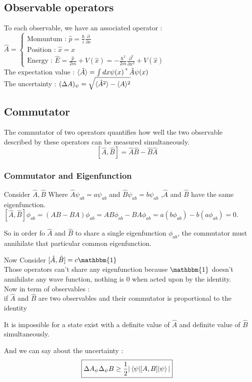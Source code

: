 \documentclass[12pt,oneside]{book}
\begin{document}
\subsection{Observable operators}
To each observable, we have an associated operator :\\
$\hat{A} = \begin{cases}
		\text{Momuntum : } \hat{p} = \frac{\hbar}{i}\frac{\partial}{\partial x} \\
		\text{Position : } \hat{x} = x                                          \\
		\text{Energy : } \hat{E} = \frac{\hat{p}}{2m}+ V(\hat{x}) = -\frac{\hbar^2}{2m}\frac{\partial^2}{\partial x^2} + V(\hat{x})
	\end{cases}$\\
The expectation value : $\langle \hat{A} \rangle = \int dx \psi(x)\operatorname{^*}\hat{A}\psi(x)$\\
The uncertainty : $(\Delta A)_\psi = \sqrt{\langle \hat{A}^2 \rangle-\langle A \rangle^2}$
\subsection{Commutator}
The commutator of two operators quantifies how well the two observable described by these operators can be measured simultaneously.
\[ [\hat{A},\hat{B}] = \hat{A}\hat{B}-\hat{B}\hat{A} \]
\subsubsection{Commutator and Eigenfunction}
	Consider $\hat{A},\hat{B}$ Where $\hat{A}\psi_{ab} = a\psi_{ab}$ and $\hat{B}\psi_{ab} = b\psi_{ab}$ ,$\hat{A}$ and $\hat{B}$ have the same eigenfunction.\\
	$[\hat{A},\hat{B}]\phi_{ab} = (AB-BA)\phi_{ab} = AB\phi_{ab}-BA\phi_{ab} = a(b\phi_{ab})-b(a\phi_{ab}) = 0$.
	\begin{center}
		So in order fo $\hat{A}$ and $\hat{B}$ to share a single eigenfunction $\phi_{ab}$, the commutator must annihilate that particular common eigenfunction.
	\end{center}
	Now Consider $[\hat{A},\hat{B}] = c \mathbbm{1}$\\
	Those operators can't share any eigenfunction because $\mathbbm{1}$ doesn't annihilate any wave function, nothing is 0 when acted upon by the identity.\\
	Now in term of observables :\\
	if $\hat{A}$ and $\hat{B}$ are two observables and their commutator is proportional to the identity
	\begin{center}
		It is impossible for a state exist with a definite value of $\hat{A}$ and definite value of $\hat{B}$ simultaneously.
	\end{center}
	And we can say about the uncertainty :
	\[\boxed{\Delta A_\psi\Delta_\psi B \geq \frac{1}{2} |\braket{\psi|[A,B]|\psi}|}\]
\end{document}
